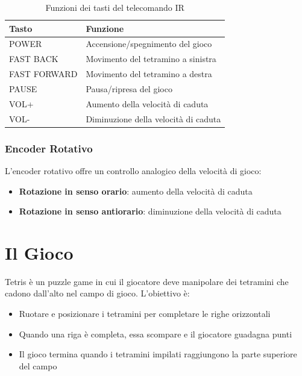 \documentclass[a4paper, 12pt]{article}
\begin{document}
\begin{table}[H]
    \centering
    \caption{Funzioni dei tasti del telecomando IR}
    \label{tab:ir-functions}
    \begin{tabular}{ll}
        \toprule
        \textbf{Tasto} & \textbf{Funzione}                    \\
        \midrule
        POWER          & Accensione/spegnimento del gioco     \\
        FAST BACK      & Movimento del tetramino a sinistra   \\
        FAST FORWARD   & Movimento del tetramino a destra     \\
        PAUSE          & Pausa/ripresa del gioco              \\
        VOL+           & Aumento della velocità di caduta     \\
        VOL-           & Diminuzione della velocità di caduta \\
        \bottomrule
    \end{tabular}
\end{table}

\subsubsection{Encoder Rotativo}
\label{subsubsec:encoder}
L'encoder rotativo offre un controllo analogico della velocità di gioco:
\begin{itemize}
    \item \textbf{Rotazione in senso orario}: aumento della velocità di caduta
    \item \textbf{Rotazione in senso antiorario}: diminuzione della velocità di caduta
\end{itemize}

\section{Il Gioco}
\label{sec:gioco}
Tetris è un puzzle game in cui il giocatore deve manipolare dei tetramini che cadono dall'alto nel campo di gioco. L'obiettivo è:
\begin{itemize}
    \item Ruotare e posizionare i tetramini per completare le righe orizzontali
    \item Quando una riga è completa, essa scompare e il giocatore guadagna punti
    \item Il gioco termina quando i tetramini impilati raggiungono la parte superiore del campo
\end{itemize}
\end{document}
